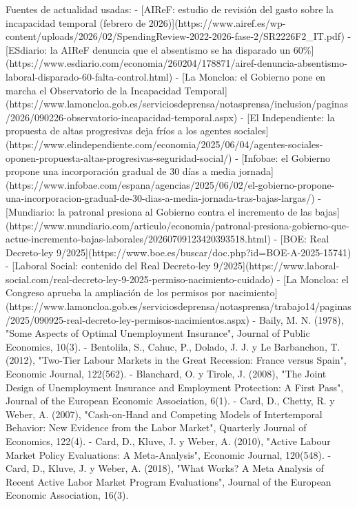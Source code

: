\documentclass[10pt,a4paper]{article}
\begin{document}
Fuentes de actualidad usadas:
- [AIReF: estudio de revisión del gasto sobre la incapacidad temporal (febrero de 2026)](https://www.airef.es/wp-content/uploads/2026/02/SpendingReview-2022-2026-fase-2/SR2226F2_IT.pdf)
- [ESdiario: la AIReF denuncia que el absentismo se ha disparado un 60\%](https://www.esdiario.com/economia/260204/178871/airef-denuncia-absentismo-laboral-disparado-60-falta-control.html)
- [La Moncloa: el Gobierno pone en marcha el Observatorio de la Incapacidad Temporal](https://www.lamoncloa.gob.es/serviciosdeprensa/notasprensa/inclusion/paginas/2026/090226-observatorio-incapacidad-temporal.aspx)
- [El Independiente: la propuesta de altas progresivas deja fríos a los agentes sociales](https://www.elindependiente.com/economia/2025/06/04/agentes-sociales-oponen-propuesta-altas-progresivas-seguridad-social/)
- [Infobae: el Gobierno propone una incorporación gradual de 30 días a media jornada](https://www.infobae.com/espana/agencias/2025/06/02/el-gobierno-propone-una-incorporacion-gradual-de-30-dias-a-media-jornada-tras-bajas-largas/)
- [Mundiario: la patronal presiona al Gobierno contra el incremento de las bajas](https://www.mundiario.com/articulo/economia/patronal-presiona-gobierno-que-actue-incremento-bajas-laborales/20260709123420393518.html)
- [BOE: Real Decreto-ley 9/2025](https://www.boe.es/buscar/doc.php?id=BOE-A-2025-15741)
- [Laboral Social: contenido del Real Decreto-ley 9/2025](https://www.laboral-social.com/real-decreto-ley-9-2025-permiso-nacimiento-cuidado)
- [La Moncloa: el Congreso aprueba la ampliación de los permisos por nacimiento](https://www.lamoncloa.gob.es/serviciosdeprensa/notasprensa/trabajo14/paginas/2025/090925-real-decreto-ley-permisos-nacimientos.aspx)
- Baily, M. N. (1978), "Some Aspects of Optimal Unemployment Insurance", Journal of Public Economics, 10(3).
- Bentolila, S., Cahuc, P., Dolado, J. J. y Le Barbanchon, T. (2012), "Two-Tier Labour Markets in the Great Recession: France versus Spain", Economic Journal, 122(562).
- Blanchard, O. y Tirole, J. (2008), "The Joint Design of Unemployment Insurance and Employment Protection: A First Pass", Journal of the European Economic Association, 6(1).
- Card, D., Chetty, R. y Weber, A. (2007), "Cash-on-Hand and Competing Models of Intertemporal Behavior: New Evidence from the Labor Market", Quarterly Journal of Economics, 122(4).
- Card, D., Kluve, J. y Weber, A. (2010), "Active Labour Market Policy Evaluations: A Meta-Analysis", Economic Journal, 120(548).
- Card, D., Kluve, J. y Weber, A. (2018), "What Works? A Meta Analysis of Recent Active Labor Market Program Evaluations", Journal of the European Economic Association, 16(3).
\end{document}
